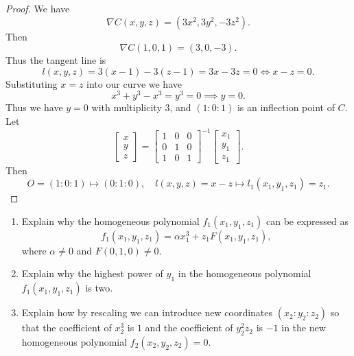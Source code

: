 \begin{proof}
    We have 
    \[
    \nabla C(x, y, z) = (3x^2, 3y^2, -3z^2).
    \]
    Then 
    \[
    \nabla C(1, 0, 1) = (3, 0, -3).
    \]
    Thus the tangent line is 
    \[
    l(x, y, z) = 3(x - 1) - 3(z - 1) = 3x - 3z = 0 \iff x - z = 0.
    \]
    Substituting $x = z$ into our curve we have 
    \[
    x^3 + y^3 - x^3 = y^3 = 0 \implies y = 0.
    \]
    Thus we have $y = 0$ with multiplicity $3$, and $(1 : 0 : 1)$ is an inflection point of $C$.
    Let
    \[
    \begin{bmatrix} x \\ y \\ z \end{bmatrix} =
    \begin{bmatrix}
    1 & 0 & 0 \\
    0 & 1 & 0 \\
    1 & 0 & 1
    \end{bmatrix}^{-1}
    \begin{bmatrix} x_1 \\ y_1 \\ z_1 \end{bmatrix}.
    \]
    Then
    \[
    O = (1:0:1) \mapsto (0:1:0), \quad
    l(x,y,z) = x-z \mapsto l_1(x_1,y_1,z_1) = z_1.
    \]
\end{proof}


\begin{tcolorbox}[title=Problem 2, breakable]
    \begin{enumerate}
        \item Explain why the homogeneous polynomial $f_1(x_1, y_1, z_1)$
        can be expressed as 
        \[f_1 (x_1, y_1, z_1) = \alpha x_1^3 + z_1 F(x_1, y_1, z_1),\]
        where $\alpha \ne 0$ and $F(0, 1, 0) \ne 0$.
        \item Explain why the highest power of $y_1$ in the homogeneous polynomial $f_1(x_1, y_1, z_1)$ is two.
        \item Explain how by rescaling we can introduce new coordinates $(x_2 : y_2 : z_2)$
        so that the coefficient of $x_2^3$ is $1$ and the coefficient of $y_2^2 z_2$ is $-1$
        in the new homogeneous polynomial $f_2(x_2, y_2, z_2) = 0$.
    \end{enumerate}
\end{tcolorbox}

